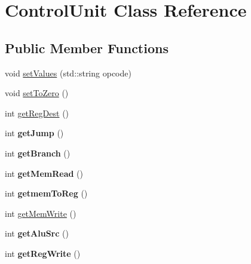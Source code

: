 \hypertarget{class_control_unit}{}\section{Control\+Unit Class Reference}
\label{class_control_unit}
\subsection*{Public Member Functions}
\begin{DoxyCompactItemize}
\item 
void \mbox{\hyperlink{class_control_unit_ac8da21614dd49149be858ad36ceb1cb6}{set\+Values}} (std\+::string opcode)
\item 
void \mbox{\hyperlink{class_control_unit_acc570fb783844eb7c25fc0df6163270c}{set\+To\+Zero}} ()
\item 
int \mbox{\hyperlink{class_control_unit_aeddfdfe24c6ec8c46394949c1a50adc7}{get\+Reg\+Dest}} ()
\item 
\mbox{\label{class_control_unit_a6d8d4d2874c72607e34ed8781ff2d64a}} 
int {\bfseries get\+Jump} ()
\item 
\mbox{\label{class_control_unit_a6b3585a68a1f3a8fc7e700063cf4f449}} 
int {\bfseries get\+Branch} ()
\item 
\mbox{\label{class_control_unit_a11ba2693b002766ca5652e972d69f01a}} 
int {\bfseries get\+Mem\+Read} ()
\item 
\mbox{\label{class_control_unit_a49650b7b8f354da8f04f8f9533931322}} 
int {\bfseries getmem\+To\+Reg} ()
\item 
int \mbox{\hyperlink{class_control_unit_a7fc9545b8dd4a871e1f64b78cf914773}{get\+Mem\+Write}} ()
\item 
\mbox{\label{class_control_unit_aa08e98486f69fc1ebc87509fb8eebb9f}} 
int {\bfseries get\+Alu\+Src} ()
\item 
\mbox{\label{class_control_unit_a36411dc5a7ac1e55db4d8dfa47f91e6b}} 
int {\bfseries get\+Reg\+Write} ()
\item 
\mbox{\label{class_control_unit_a5f88deaa3119aa38812edd8cf1d75b70}} 

\end{DoxyCompactItemize}
